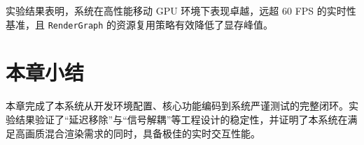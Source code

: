 实验结果表明，系统在高性能移动 GPU 环境下表现卓越，远超 60 FPS 的实时性基准，且 \texttt{RenderGraph} 的资源复用策略有效降低了显存峰值。

\section{本章小结}
本章完成了本系统从开发环境配置、核心功能编码到系统严谨测试的完整闭环。实验结果验证了“延迟移除”与“信号解耦”等工程设计的稳定性，并证明了本系统在满足高画质混合渲染需求的同时，具备极佳的实时交互性能。
